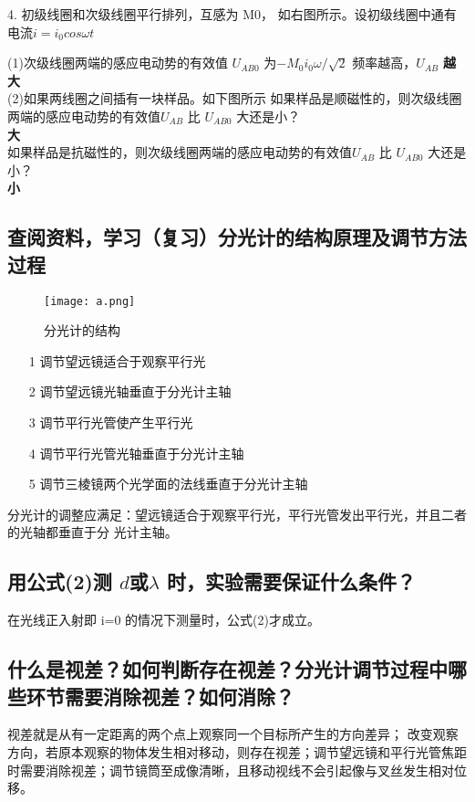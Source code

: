 \documentclass[12pt, a4paper, oneside]{ctexbook}
\begin{document}
4. 初级线圈和次级线圈平行排列，互感为 M0，
如右图所示。设初级线圈中通有电流$  i=i_0cos\omega t $

(1)次级线圈两端的感应电动势的有效值 $ U_{AB0} $
为$ -M_0i_0\omega /\sqrt{2} $
频率越高，$ U_{AB} $  \textbf{越大} \\

(2)如果两线圈之间插有一块样品。如下图所示
如果样品是顺磁性的，则次级线圈两端的感应电动势的有效值$ U_{AB} $ 比 $ U_{AB0} $ 大还是小？\\\textbf{大}\\
如果样品是抗磁性的，则次级线圈两端的感应电动势的有效值$ U_{AB} $ 比 $ U_{AB0} $ 大还是小？\\\textbf{小}\\
\newpage
\subsection*{查阅资料，学习（复习）分光计的结构原理及调节方法过程}
\begin{figure}
    \centering
    \caption{分光计的结构}
    \texttt{[image: a.png]}
\end{figure}
\begin{itemize}
    \item[1] 调节望远镜适合于观察平行光
    \item[2] 调节望远镜光轴垂直于分光计主轴
    \item[3] 调节平行光管使产生平行光
    \item[4] 调节平行光管光轴垂直于分光计主轴
    \item[5] 调节三棱镜两个光学面的法线垂直于分光计主轴
\end{itemize}
分光计的调整应满足：望远镜适合于观察平行光，平行光管发出平行光，并且二者的光轴都垂直于分
光计主轴。
\subsection*{用公式(2)测 $ d $或$ \lambda $ 时，实验需要保证什么条件？}
在光线正入射即 i=0 的情况下测量时，公式(2)才成立。

\subsection*{什么是视差？如何判断存在视差？分光计调节过程中哪些环节需要消除视差？如何消除？}
视差就是从有一定距离的两个点上观察同一个目标所产生的方向差异；
改变观察方向，若原本观察的物体发生相对移动，则存在视差；调节望远镜和平行光管焦距时需要消除视差；调节镜筒至成像清晰，且移动视线不会引起像与叉丝发生相对位移。
\end{document}
